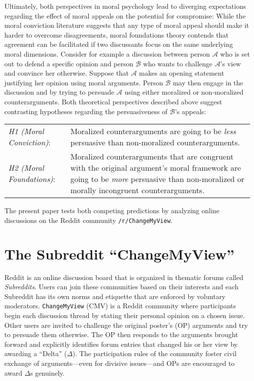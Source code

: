 Ultimately, both perspectives in moral psychology lead to diverging expectations regarding the effect of moral appeals on the potential for compromise: While the moral conviction literature suggests that any type of moral appeal should make it harder to overcome disagreements, moral foundations theory contends that agreement can be facilitated if two discussants focus on the same underlying moral dimensions. Consider for example a discussion between person $\mathcal{A}$ who is set out to defend a specific opinion and person $\mathcal{B}$ who wants to challenge $\mathcal{A}$'s view and convince her otherwise. Suppose that $\mathcal{A}$ makes an opening statement justifying her opinion using moral arguments. Person $\mathcal{B}$ may then engage in the discussion and by trying to persuade $\mathcal{A}$ using either moralized or non-moralized counterarguments. Both theoretical perspectives described above suggest contrasting hypotheses regarding the persuasiveness of $\mathcal{B}$'s appeals:
\begin{center}\singlespacing\begin{tabularx}{\textwidth}{lX}
\textit{H1 (Moral Conviction)}: & Moralized counterarguments are going to be \textit{less} persuasive than non-moralized counterarguments.\\
\textit{H2 (Moral Foundations)}: & Moralized counterarguments that are congruent with the original argument's moral framework are going to be \textit{more} persuasive than non-moralized or morally incongruent counterarguments.
\end{tabularx}\end{center}

The present paper tests both competing predictions by analyzing online discussions on the Reddit community \texttt{/r/ChangeMyView}. 




\section{The Subreddit ``ChangeMyView''}

Reddit is an online discussion board that is organized in thematic forums called \textit{Subreddits}. Users can join these communities based on their interests and each Subreddit has its own norms and etiquette that are enforced by voluntary moderators. \texttt{ChangeMyView} (CMV) is a Reddit community where participants begin each discussion thread by stating their personal opinion on a chosen issue. Other users are invited to challenge the original poster's (OP) arguments and try to persuade them otherwise. The OP then responds to the arguments brought forward and explicitly identifies forum entries that changed his or her view by awarding a ``Delta'' ($\Delta$). The participation rules of the community foster civil exchange of arguments---even for divisive issues---and OPs are encouraged to award \(\Delta\)s genuinely.

